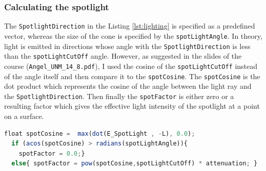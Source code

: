 \documentclass[12pt,a4paper]{article}
\begin{document}
\subsubsection{Calculating the spotlight}
The \texttt{SpotlightDirection} in the  Listing \ref{lst:lighting} is specified as a predefined vector, whereas the size of the cone is specified by the \texttt{spotLightAngle}. In theory, light is emitted in directions whose angle with the \texttt{SpotlightDirection} is less than the \texttt{spotLightCutOff} angle.  However, as suggested in the slides of the course (\texttt{Angel\_UNM\_14\_8.pdf}),
I used the cosine of the  \texttt{spotLightCutOff}  instead of the angle itself and then compare it to the \texttt{spotCosine}. The \texttt{spotCosine} is the dot product which represents the cosine of the angle between the light ray and the \texttt{SpotlightDirection}. Then finally the \texttt{spotFactor} is either zero or a resulting factor which gives the effective light intensity of the spotlight at a point on a surface.
 
 \begin{lstlisting}[caption={Spotfactor assignment},label={lst:spotfactor},language=JavaScript]
  float spotCosine =  max(dot(E_SpotLight , -L), 0.0);
  if (acos(spotCosine) > radians(spotLightAngle)){
    spotFactor = 0.0;}
  else{ spotFactor = pow(spotCosine,spotLightCutOff) * attenuation; }
\end{lstlisting}
\end{document}
